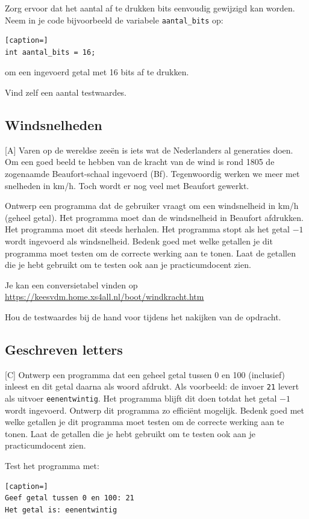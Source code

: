 \documentclass[a4paper,10pt,fleqn,twoside]{article}
\begin{document}
Zorg ervoor dat het aantal af te drukken bits eenvoudig gewijzigd kan worden. Neem in je code bijvoorbeeld de variabele \lstinline|aantal_bits| op:

\begin{lstlisting}[caption=]
int aantal_bits = 16;
\end{lstlisting}

om een ingevoerd getal met 16 bits af te drukken.

Vind zelf een aantal testwaardes. 

\subsection{Windsnelheden}[A]
Varen op de wereldse zeeën is iets wat de Nederlanders al generaties doen. Om een goed beeld te hebben van de kracht van de wind is rond 1805 de zogenaamde Beaufort-schaal ingevoerd (Bf). Tegenwoordig werken we meer met snelheden in km/h. Toch wordt er nog veel met Beaufort gewerkt.

Ontwerp een programma dat de gebruiker vraagt om een windsnelheid in km/h (geheel getal). Het programma moet dan de windsnelheid in Beaufort afdrukken. Het programma moet dit steeds herhalen. Het programma stopt als het getal $-1$ wordt ingevoerd als windsnelheid. Bedenk goed met welke getallen je dit programma moet testen om de correcte werking aan te tonen. Laat de getallen die je hebt gebruikt om te testen ook aan je practicumdocent zien.

Je kan een conversietabel vinden op \url{https://keesvdm.home.xs4all.nl/boot/windkracht.htm}

Hou de testwaardes bij de hand voor tijdens het nakijken van de opdracht.

\subsection{Geschreven letters}[C]
Ontwerp een programma dat een geheel getal tussen 0 en 100 (inclusief) inleest en dit getal daarna als woord afdrukt. Als voorbeeld: de invoer \texttt{21} levert als uitvoer \texttt{eenentwintig}. Het programma blijft dit doen totdat het getal $-1$ wordt ingevoerd. Ontwerp dit programma zo efficiënt mogelijk. Bedenk goed met welke getallen je dit programma moet testen om de correcte werking aan te tonen. Laat de getallen die je hebt gebruikt om te testen ook aan je practicumdocent zien.

Test het programma met:

\begin{lstlisting}[caption=]
Geef getal tussen 0 en 100: 21
Het getal is: eenentwintig
\end{lstlisting}
\end{document}
